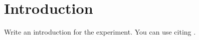 \section{Introduction}

Write an introduction for the experiment. You can use citing \cite{citation_key}.